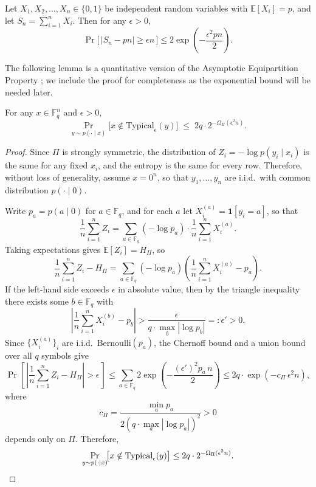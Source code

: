 \documentclass[11pt]{article}
\newcommand{\typical}{\mathrm{Typical}}
\theoremstyle{named}
\begin{document}
\begin{lemma}
Let $X_1, X_2, \ldots, X_n \in \{0,1\}$ be independent random variables with
$\mathbb{E}[X_i] = p$, and let $S_n = \sum_{i=1}^n X_i$. 
Then for any $\epsilon > 0$,
\[
\Pr\bigl[\, |S_n - pn| \ge \epsilon n \,\bigr]
\le 2 \exp\!\left( - \frac{\epsilon^2 pn}{2} \right).
\]
\end{lemma}

The following lemma is a quantitative version of the Asymptotic Equipartition Property \cite{CoverThomas2006}; we include the proof for completeness as the exponential bound will be needed later.

\begin{lemma}
\label{lem:typical_prob}
For any $x \in \mathbb{F}_q^n$ and $\epsilon > 0$,
\[
\Pr_{y \sim p(\cdot \mid x)}\!\bigl[x \notin \typical_\epsilon(y)\bigr] \;\le\; 2q\cdot 2^{-\Omega_\Pi(\epsilon^2 n)}.
\]
\end{lemma}
\begin{proof}
Since $\Pi$ is strongly symmetric, the distribution of $Z_i = -\log p(y_i \mid x_i)$
is the same for any fixed $x_i$, and the entropy is the same for every
row. Therefore, without loss of generality, assume $x = 0^n$, so that
$y_1, \ldots, y_n$ are i.i.d.\ with common distribution $p(\cdot \mid 0)$.

Write $p_a = p(a \mid 0)$ for $a \in \mathbb{F}_q$, and for each $a$ let
$X_i^{(a)} = \mathbf{1}[y_i = a]$, so that
\[
\frac{1}{n}\sum_{i=1}^n Z_i
= \sum_{a \in \mathbb{F}_q} (-\log p_a)\cdot \frac{1}{n}\sum_{i=1}^n X_i^{(a)}.
\]
Taking expectations gives $\mathbb{E}[Z_i] = H_\Pi$, so
\[
\frac{1}{n}\sum_{i=1}^n Z_i - H_\Pi
= \sum_{a \in \mathbb{F}_q}(-\log p_a)
  \left(\frac{1}{n}\sum_{i=1}^n X_i^{(a)} - p_a\right).
\]
If the left-hand side exceeds $\epsilon$ in absolute value, then by the triangle
inequality there exists some $b \in \mathbb{F}_q$ with
\[
\left|\frac{1}{n}\sum_{i=1}^n X_i^{(b)} - p_{b}\right|
> \frac{\epsilon}{q \cdot \max_b |\log p_b|} =: \epsilon' > 0.
\]
Since $\{X_i^{(a)}\}_i$ are i.i.d.\ Bernoulli$(p_a)$, the Chernoff bound and a
union bound over all $q$ symbols give
\[
\Pr\!\left[\,\left|\frac{1}{n}\sum_{i=1}^n Z_i - H_\Pi\right| > \epsilon\,\right]
\leq \sum_{a \in \mathbb{F}_q} 2\exp\!\left(-\frac{(\epsilon')^2 p_a\, n}{2}\right)
\leq 2q \cdot \exp(-c_\Pi\,\epsilon^2 n),
\]
where 
\[
c_\Pi = \frac{\min_a p_a}{2(q \cdot \max_a |\log p_a|)^2} > 0
\]
depends only on $\Pi$. Therefore,
\[
\Pr_{y \sim p(\cdot \mid x)}\!\bigl[x \notin \mathrm{Typical}_\epsilon(y)\bigr]
\leq 2q \cdot 2^{-\Omega_\Pi(\epsilon^2 n)}.
\qedhere
\]
\end{proof}
\end{document}
